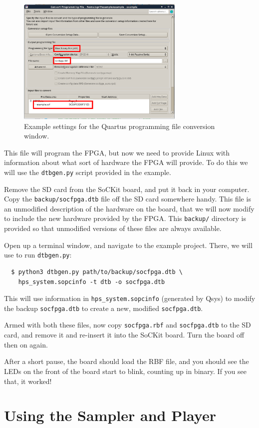 \documentclass{sockitguide}
\begin{document}
\begin{figure}
  \includegraphics[width=8cm]{figures/rbf.png}
  \caption{Example settings for the Quartus programming file conversion window.}
  \label{fig:rbf}
\end{figure}

This file will program the FPGA, but now we need to provide Linux with
information about what sort of hardware the FPGA will provide. To do
this we will use the \texttt{dtbgen.py} script provided in the
example.

Remove the SD card from the SoCKit board, and put it back in your
computer. Copy the \texttt{backup/socfpga.dtb} file off the SD card
somewhere handy. This file is an unmodified description of the
hardware on the board, that we will now modify to include the new
hardware provided by the FPGA. This \texttt{backup/} directory is
provided so that unmodified versions of these files are always
available.

Open up a terminal window, and navigate to the example project. There,
we will use  to run
\texttt{dtbgen.py}:
\begin{verbatim}
  $ python3 dtbgen.py path/to/backup/socfpga.dtb \
    hps_system.sopcinfo -t dtb -o socfpga.dtb
\end{verbatim}

This will use information in \texttt{hps\_system.sopcinfo} (generated
by Qsys) to modify the backup \texttt{socfpga.dtb} to create a new,
modified \texttt{socfpga.dtb}.

Armed with both these files, now copy \texttt{socfpga.rbf} and
\texttt{socfpga.dtb} to the SD card, and remove it and re-insert it
into the SoCKit board. Turn the board off then on again.

After a short pause, the board should load the RBF file, and you
should see the LEDs on the front of the board start to blink, counting
up in binary. If you see that, it worked!

\section{Using the Sampler and Player}
\end{document}
